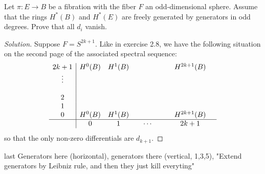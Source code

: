 \begin{manualexercise}{2.11}
	Let $\pi:E\to B$ be a fibration with the fiber $F$ an odd-dimensional sphere. Assume that the rings $H^{*}(B)$ and  $H^{*}(E)$ are freely generated by generators in odd degrees. Prove that all $d_i$ vanish.
\end{manualexercise}

\begin{proof}[Solution]\leavevmode
	Suppose $F=S^{2k+1}$. Like in exercise 2.8, we have the following situation on the second page of the associated spectral sequence:
	\begin{align*}
\begin{array}{c|cccccccc}
	2k+1&H^0(B)&H^{1}(B)&&&&&H^{2k+1}(B)&\\
	\vdots &&&&&&&&\\
	&&&&&&&&\\
	2&&&&&&&&\\
	1&&&&&&&&\\
	0&H^0(B)&H^{1}(B)&&&&&H^{2k+1}(B)&\\
	\hline
	 &0&1&&\cdots &&&2k+1&
\end{array}
\end{align*}
so that the only non-zero differentials are $d_{k+1}$.
\end{proof}

\begin{manualexercise}{last}
	Generators here (horizontal), generators there (vertical, 1,3,5), "Extend generators by Leibniz rule, and then they just kill everyting"
\end{manualexercise}


